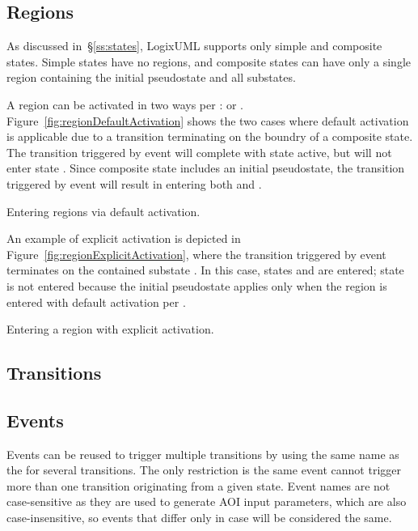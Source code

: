 \subsection{Regions}

As discussed in~\S\ref{ss:states}, LogixUML supports only simple and
composite states. Simple states have no regions, and composite states
can have only a single region containing the initial pseudostate and
all substates.

A region can be activated in two ways per \textcite[\S14.2.3.2]{OMGUML}:
 or
.
Figure~\ref{fig:regionDefaultActivation} shows the two cases where
default activation is applicable due to a transition terminating
on the boundry of a composite state. The transition triggered by
event  will complete with state 
active, but will not enter state .
Since composite state  includes an initial
pseudostate, the transition triggered by event  will
result in entering both  and .

               {Entering regions via default activation.}

An example of explicit activation is depicted in
Figure~\ref{fig:regionExplicitActivation}, where the transition triggered
by event  terminates on the contained substate
. In this case, states  and
 are entered;
state  is not entered because the initial pseudostate
applies only when the region is entered with default activation per
\textcite[\S14.2.3.7]{OMGUML}.

               {Entering a region with explicit activation.}


\subsection{Transitions}


\subsection{Events}

Events can be reused to trigger multiple transitions by using the
same name as the  for several transitions.
The only restriction is the same event cannot trigger more than
one transition originating from a given state.
Event names are not case-sensitive as they are used to generate AOI input
parameters, which are also case-insensitive, so events that differ only in
case will be considered the same.

